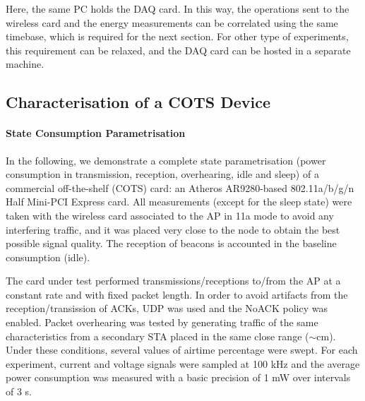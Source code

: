 \documentclass[twoside,nohyper]{tufte-book}
\theoremstyle{definition}
\theoremstyle{definition}
\theoremstyle{definition}
\theoremstyle{remark}
\begin{document}
Here, the same PC holds the DAQ card. In this way, the operations sent
to the wireless card and the energy measurements can be correlated using
the same timebase, which is required for the next section. For other
type of experiments, this requirement can be relaxed, and the DAQ card
can be hosted in a separate machine.

\hypertarget{characterisation-of-a-cots-device}{%
\subsection{Characterisation of a COTS
Device}\label{characterisation-of-a-cots-device}}

\hypertarget{state-consumption-parametrisation}{%
\paragraph{State Consumption
Parametrisation}\label{state-consumption-parametrisation}}

In the following, we demonstrate a complete state parametrisation (power
consumption in transmission, reception, overhearing, idle and sleep) of
a commercial off-the-shelf (COTS) card: an Atheros AR9280-based
802.11a/b/g/n Half Mini-PCI Express card. All measurements (except for
the sleep state) were taken with the wireless card associated to the AP
in 11a mode to avoid any interfering traffic, and it was placed very
close to the node to obtain the best possible signal quality. The
reception of beacons is accounted in the baseline consumption (idle).

The card under test performed transmissions/receptions to/from the AP at
a constant rate and with fixed packet length. In order to avoid
artifacts from the reception/transission of ACKs, UDP was used and the
NoACK policy was enabled. Packet overhearing was tested by generating
traffic of the same characteristics from a secondary STA placed in the
same close range (\(\sim\)cm). Under these conditions, several values of
airtime percentage were swept. For each experiment, current and voltage
signals were sampled at 100 kHz and the average power consumption was
measured with a basic precision of 1 mW over intervals of 3 s.

\pagebreak
\end{document}
